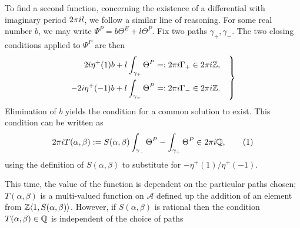 \documentclass{article}
\begin{document}
To find a second function, concerning the existence of a differential with imaginary period $2\pi i l$, we follow a similar line of reasoning. For some real number $b$, we may write $\Psi^P = b \Theta^E + l \Theta^P$. Fix two paths $\gamma_+, \gamma_-$. The two closing conditions applied to $\Psi^P$ are then
\begin{equation}
\left.
\begin{aligned}
2i \eta^+(1) b + l\int_{\gamma_+} \Theta^P &=: 2\pi i \Gamma_+ \in 2\pi i \mathbb{Z}, \\
-2i \eta^+(-1) b + l\int_{\gamma_-} \Theta^P &=: 2\pi i \Gamma_- \in 2\pi i \mathbb{Z}.
\end{aligned}
\quad
\right\}
\label{eqn:period closing cond}
\end{equation}
Elimination of $b$ yields the condition for a common solution to exist. This condition can be written as
\[
2\pi\iu T(\alpha,\beta) := S(\alpha,\beta) \int_{\gamma_-} \Theta^P - \int_{\gamma_+} \Theta^P
\in 2\pi\iu \Q,
\labelthis{eqn:def_T}
\]
using the definition of $S(\alpha,\beta)$ to substitute for $-\eta^+(1)/\eta^+(-1)$. 

This time, the value of the function is dependent on the particular paths chosen; 
$T(\alpha,\beta)$ is a multi-valued function on $\mathcal{A}$ defined up the addition of an element from $\mathbb{Z}\langle 1,S(\alpha,\beta)\rangle$.
However, if $S(\alpha,\beta)$ is rational then the condition $T(\alpha,\beta)\in\mathbb{Q}$ is independent of the choice of paths
\end{document}
